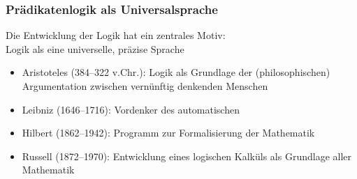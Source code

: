 \documentclass[aspectratio=1610,onlymath]{beamer}
\begin{document}
\begin{frame}\label{frame_logiker}\frametitle{Prädikatenlogik als Universalsprache}

Die Entwicklung der Logik hat ein zentrales Motiv:\\
\alert{Logik als eine universelle, präzise Sprache}\pause

\begin{itemize}
\item {}%
	Aristoteles (384--322 v.Chr.): Logik als Grundlage der (philosophischen) Argumentation zwischen vernünftig denkenden Menschen\pause
\item {}%
	Leibniz (1646--1716): Vordenker des automatischen \\
\pause
\item {}%
	Hilbert (1862--1942): Programm zur Formalisierung der Mathematik\pause
\item {}%
	Russell (1872--1970): Entwicklung eines logischen Kalküls als Grundlage aller Mathematik
\end{itemize}

\end{frame}
\end{document}
